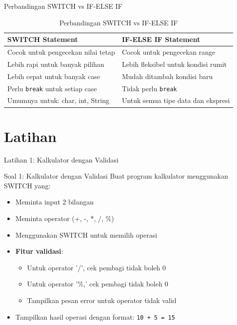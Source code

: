 \documentclass{beamer}
\begin{document}
\begin{frame}{Perbandingan SWITCH vs IF-ELSE IF}
  \begin{table}
    \footnotesize
    \begin{tabular}{p{}|p{}}
    \textbf{SWITCH Statement} & \textbf{IF-ELSE IF Statement} \\
    \hline
    \rowcolor{lightgray}
    Cocok untuk pengecekan nilai tetap & Cocok untuk pengecekan range \\
    \rowcolor{white}
    Lebih rapi untuk banyak pilihan & Lebih fleksibel untuk kondisi rumit \\
    \rowcolor{lightgray}
    Lebih cepat untuk banyak case & Mudah ditambah kondisi baru \\
    \rowcolor{white}
    Perlu \texttt{break} untuk setiap case & Tidak perlu \texttt{break} \\
    \rowcolor{lightgray}
    Umumnya untuk: char, int, String & Untuk semua tipe data dan ekspresi \\
    \end{tabular}
    \caption{Perbandingan SWITCH vs IF-ELSE IF}
  \end{table}
\end{frame}

\section{Latihan}
\begin{frame}{Latihan 1: Kalkulator dengan Validasi}
  \begin{block}{Soal 1: Kalkulator dengan Validasi}
    Buat program kalkulator menggunakan SWITCH yang:
    \begin{itemize}
      \item Meminta input 2 bilangan
      \item Meminta operator (+, -, *, /, \%)
      \item Menggunakan SWITCH untuk memilih operasi
      \item \textbf{Fitur validasi}:
        \begin{itemize}
          \item Untuk operator '/', cek pembagi tidak boleh 0
          \item Untuk operator '\%,' cek pembagi tidak boleh 0  
          \item Tampilkan pesan error untuk operator tidak valid
        \end{itemize}
      \item Tampilkan hasil operasi dengan format: 
        \texttt{10 + 5 = 15}
    \end{itemize}
  \end{block}
\end{frame}
\end{document}
